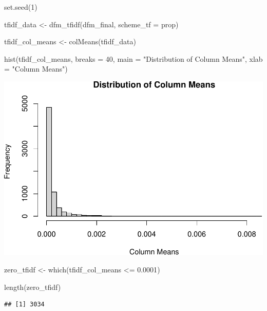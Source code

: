 \documentclass[
]{article}
\newenvironment{Shaded}{\begin{snugshade}}{\end{snugshade}}
\newcommand{\AttributeTok}[1]{\textcolor[rgb]{0.77,0.63,0.00}{#1}}
\newcommand{\DecValTok}[1]{\textcolor[rgb]{0.00,0.00,0.81}{#1}}
\newcommand{\FloatTok}[1]{\textcolor[rgb]{0.00,0.00,0.81}{#1}}
\newcommand{\FunctionTok}[1]{\textcolor[rgb]{0.00,0.00,0.00}{#1}}
\newcommand{\NormalTok}[1]{#1}
\newcommand{\OtherTok}[1]{\textcolor[rgb]{0.56,0.35,0.01}{#1}}
\newcommand{\SpecialCharTok}[1]{\textcolor[rgb]{0.00,0.00,0.00}{#1}}
\newcommand{\StringTok}[1]{\textcolor[rgb]{0.31,0.60,0.02}{#1}}
\begin{document}
\begin{Shaded}
\begin{Highlighting}[]
\FunctionTok{set.seed}\NormalTok{(}\DecValTok{1}\NormalTok{)}

\NormalTok{tfidf\_data }\OtherTok{\textless{}{-}} \FunctionTok{dfm\_tfidf}\NormalTok{(dfm\_final, }\AttributeTok{scheme\_tf =} \StringTok{\textquotesingle{}prop\textquotesingle{}}\NormalTok{)}

\NormalTok{tfidf\_col\_means }\OtherTok{\textless{}{-}} \FunctionTok{colMeans}\NormalTok{(tfidf\_data)}

\FunctionTok{hist}\NormalTok{(tfidf\_col\_means, }\AttributeTok{breaks =} \DecValTok{40}\NormalTok{, }\AttributeTok{main =} \StringTok{"Distribution of Column Means"}\NormalTok{, }\AttributeTok{xlab =} \StringTok{"Column Means"}\NormalTok{)}
\end{Highlighting}
\end{Shaded}

\includegraphics{classifier_files/figure-latex/tfidf-1.pdf}

\begin{Shaded}
\begin{Highlighting}[]
\NormalTok{zero\_tfidf }\OtherTok{\textless{}{-}} \FunctionTok{which}\NormalTok{(tfidf\_col\_means }\SpecialCharTok{\textless{}=} \FloatTok{0.0001}\NormalTok{)}

\FunctionTok{length}\NormalTok{(zero\_tfidf)}
\end{Highlighting}
\end{Shaded}

\begin{verbatim}
## [1] 3034
\end{verbatim}
\end{document}
